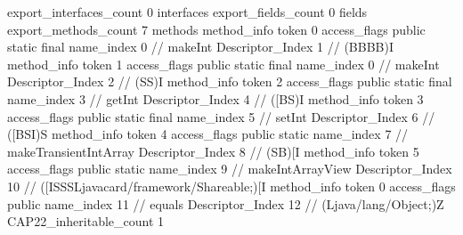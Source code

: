 {{{{			}
			export_interfaces_count	0
			interfaces {
			}
			export_fields_count	0
			fields {
			}
			export_methods_count	7
			methods {
				method_info {
					token	0
					access_flags	public static final
					name_index	0		// makeInt
					Descriptor_Index	1		// (BBBB)I
				}
				method_info {
					token	1
					access_flags	public static final
					name_index	0		// makeInt
					Descriptor_Index	2		// (SS)I
				}
				method_info {
					token	2
					access_flags	public static final
					name_index	3		// getInt
					Descriptor_Index	4		// ([BS)I
				}
				method_info {
					token	3
					access_flags	public static final
					name_index	5		// setInt
					Descriptor_Index	6		// ([BSI)S
				}
				method_info {
					token	4
					access_flags	public static
					name_index	7		// makeTransientIntArray
					Descriptor_Index	8		// (SB)[I
				}
				method_info {
					token	5
					access_flags	public static
					name_index	9		// makeIntArrayView
					Descriptor_Index	10		// ([ISSSLjavacard/framework/Shareable;)[I
				}
				method_info {
					token	0
					access_flags	public
					name_index	11		// equals
					Descriptor_Index	12		// (Ljava/lang/Object;)Z
				}
			}
			CAP22_inheritable_count	1
		}
	}
}

